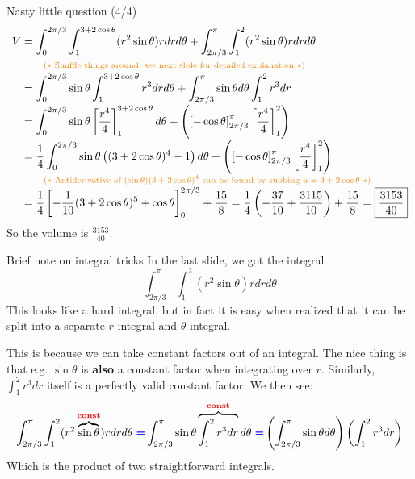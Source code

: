 \begin{frame}{Nasty little question (4/4)}
    \footnotesize
    \begin{align*}
        V&=\int_0^{2\pi/3}\int_1^{3+2\cos\theta}(r^2\sin\theta)rdrd\theta+\int_{2\pi/3}^{\pi}\int_{1}^2(r^2\sin\theta) rdrd\theta\\[-1mm]
         &\qquad\textcolor{orange}{\text{\scriptsize ($*$ Shuffle things around, see next slide for detailed explanation $*$)}}\\[-1mm]
         &=\int_0^{2\pi/3}\sin\theta\int_1^{3+2\cos\theta}r^3drd\theta+\int_{2\pi/3}^{\pi}\sin\theta d\theta\int_{1}^2r^3 dr\\[-1mm]
         &=\int_0^{2\pi/3}\sin\theta\left[\frac{r^4}{4}\right]_1^{3+2\cos\theta}d\theta+\left(\left[-\cos\theta\right]_{2\pi/3}^{\pi} \left[\frac{r^4}{4}\right]_1^2\right)\\[-1mm]
         &=\frac{1}{4}\int_0^{2\pi/3}\sin\theta\left((3+2\cos\theta)^4-1\right)d\theta+\left(\left[-\cos\theta\right]_{2\pi/3}^{\pi} \left[\frac{r^4}{4}\right]_1^2\right)\\[-1mm]
         &\qquad\textcolor{orange}{\text{\scriptsize ($*$ Antiderivative of $(\sin\theta)(3+2\cos\theta)^4$ can be found by subbing $u=3+2\cos\theta$ $*$)}}\\[-1mm]
         &=\frac{1}{4}\left[-\frac{1}{10}(3+2\cos\theta)^5+\cos\theta\right]_0^{2\pi/3}+\frac{15}{8}=\frac{1}{4}\left(-\frac{37}{10}+\frac{3115}{10}\right)+\frac{15}{8}=\boxed{\frac{3153}{40}}\\
    \end{align*}
    So the volume is $\frac{3153}{40}$.
\end{frame}

\begin{frame}{Brief note on integral tricks}\label{integraltrick}
    In the last slide, we got the integral \[\int_{2\pi/3}^{\pi}\int_{1}^2(r^2\sin\theta) rdrd\theta\] This looks like a hard integral, but in fact it is easy when realized that it can be split into a separate $r$-integral and $\theta$-integral.

    This is because we can take constant factors out of an integral. The nice thing is that e.g. $\sin\theta$ is \textbf{also} a constant factor when integrating over $r$. Similarly, $\int_1^2 r^3 dr$ itself is a perfectly valid constant factor. We then see:
    {\footnotesize
    \[\int_{2\pi/3}^{\pi}\int_{1}^2(r^2\overbrace{\sin\theta}^{\textcolor{red}{\textbf{const}}}) rdrd\theta \textcolor{blue}{~\pmb{=}} \int_{2\pi/3}^{\pi}\sin\theta\overbrace{\int_{1}^2r^3 dr}^{\textcolor{red}{\textbf{const}}}d\theta \textcolor{blue}{~\pmb{=}} \left(\int_{2\pi/3}^{\pi}\sin\theta d\theta\right)\left(\int_1^2r^3dr\right)\]}
    Which is the product of two straightforward integrals.
\end{frame}


